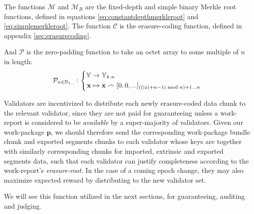 The functions $\mathcal{M}$ and $\mathcal{M}_B$ are the fixed-depth and simple binary Merkle root functions, defined in equations \ref{eq:constantdepthmerkleroot} and \ref{eq:simplemerkleroot}. The function $\mathcal{C}$ is the erasure-coding function, defined in appendix \ref{sec:erasurecoding}.

And $\mathcal{P}$ is the zero-padding function to take an octet array to some multiple of $n$ in length:
\begin{equation}\label{eq:zeropadding}
  \mathcal{P}_{n \in \N_{1\dots}}\colon\left\{\begin{aligned}
    \Y &\to \Y_{k\cdot n}\\
    \mathbf{x} &\mapsto \mathbf{x} \concat [0, 0, ...]_{((|x|+n - 1) \bmod n) + 1 \dots n}
  \end{aligned}\right.
\end{equation}

Validators are incentivized to distribute each newly erasure-coded data chunk to the relevant validator, since they are not paid for guaranteeing unless a work-report is considered to be \emph{available} by a super-majority of validators. Given our work-package $\mathbf{p}$, we should therefore send the corresponding work-package bundle chunk and exported segments chunks to each validator whose keys are together with similarly corresponding chunks for imported, extrinsic and exported segments data, such that each validator can justify completeness according to the work-report's \emph{erasure-root}. In the case of a coming epoch change, they may also maximize expected reward by distributing to the new validator set.

We will see this function utilized in the next sections, for guaranteeing, auditing and judging.

\undef{\newavailabilityspecifier}
\undef{\itemtoresult}
\undef{\countupexports}
\undef{\importsegmentdata}
\undef{\pagedproofs}
\undef{\marshallrefine}
\undef{\extrinsicdata}
\undef{\wpX}
\undef{\wiX}